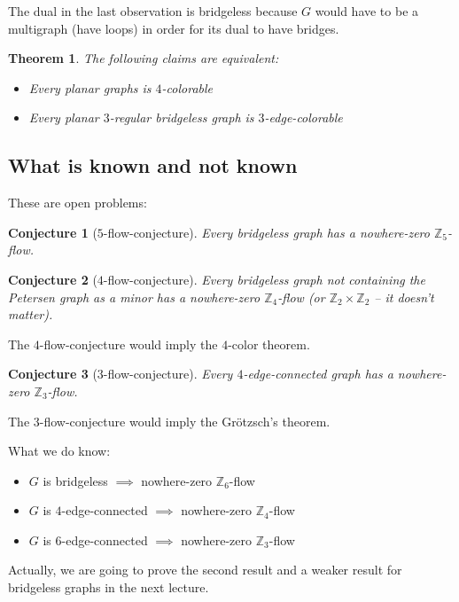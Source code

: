 \documentclass{article}
\newtheorem*{theorem}{Theorem}
\newtheorem*{conjecture}{Conjecture}
\newcommand{\Z}{\mathbb{Z}}
\begin{document}
\noindent
The dual in the last observation is bridgeless because $G$ would have to be a
multigraph (have loops) in order for its dual to have bridges.

\begin{theorem}
	The following claims are equivalent:
	\begin{itemize}
		\item Every planar graphs is $4$-colorable
		\item Every planar $3$-regular bridgeless graph is
			$3$-edge-colorable
	\end{itemize}
\end{theorem}

\subsection*{What is known and not known}
These are open problems:

\begin{conjecture}[$5$-flow-conjecture]
	Every bridgeless graph has a nowhere-zero $\Z_5$-flow.
\end{conjecture}

\begin{conjecture}[$4$-flow-conjecture]
	Every bridgeless graph not containing the Petersen graph as a minor has
	a nowhere-zero $\Z_4$-flow (or $\Z_2 \times \Z_2$ -- it doesn't
	matter).
\end{conjecture}

\noindent
The $4$-flow-conjecture would imply the $4$-color theorem.

\begin{conjecture}[$3$-flow-conjecture]
	Every $4$-edge-connected graph has a nowhere-zero $\Z_3$-flow.
\end{conjecture}

\noindent
The $3$-flow-conjecture would imply the Grötzsch's theorem.

\noindent
What we do know:
\begin{itemize}
	\item $G$ is bridgeless $\implies$ nowhere-zero $\Z_6$-flow
	\item $G$ is $4$-edge-connected $\implies$ nowhere-zero $\Z_4$-flow
	\item $G$ is $6$-edge-connected $\implies$ nowhere-zero $\Z_3$-flow
\end{itemize}

\noindent
Actually, we are going to prove the second result and a weaker result for
bridgeless graphs in the next lecture.
\end{document}
